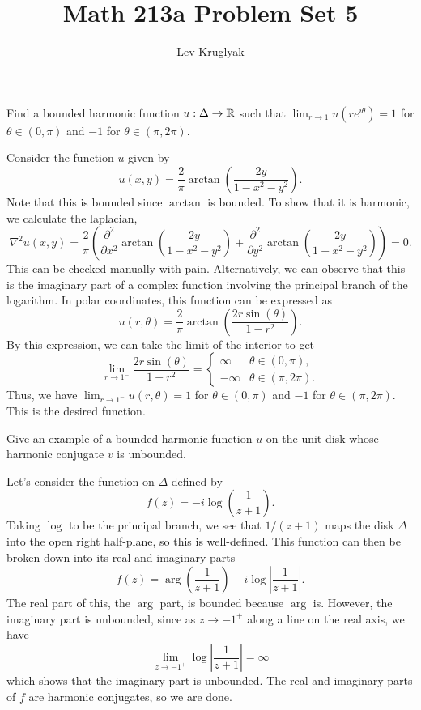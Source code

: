 \documentclass{pset}
\title{Math 213a Problem Set 5}
\author{Lev Kruglyak}
\begin{document}
\maketitle
\collaborators

\begin{problem}{1.39}
  Find a bounded harmonic function $u : \Delta \to \mathbb{R}$ such that $\lim_{r\to 1} u(re^{i\theta})=1$ for $\theta\in (0,\pi)$ and $-1$ for $\theta\in (\pi, 2\pi)$.
\end{problem}

\begin{solution}
  Consider the function $u$ given by
  \[
    u(x,y) = \frac{2}{\pi}\arctan\left(\frac{2y}{1-x^2-y^2}\right).
  \]
  Note that this is bounded since $\arctan$ is bounded. To show that it is harmonic, we calculate the laplacian,
  \[
    \nabla^2 u(x,y) = \frac{2}{\pi}\left(\frac{\partial^2}{\partial x^2}\arctan\left(\frac{2y}{1-x^2-y^2}\right) + \frac{\partial^2}{\partial y^2}\arctan\left(\frac{2y}{1-x^2-y^2}\right)\right)=0.
  \]
  This can be checked manually with pain. Alternatively, we can observe that this is the imaginary part of a complex function involving the principal branch of the logarithm. 
  In polar coordinates, this function can be expressed as 
  \[
    u(r,\theta)=\frac{2}{\pi}\arctan\left(\frac{2r\sin(\theta)}{1-r^2}\right).
  \]
  By this expression, we can take the limit of the interior to get
  \[\lim_{r\to 1^-} \frac{2r\sin(\theta)}{1-r^2} = \begin{cases}\infty & \theta\in (0,\pi),\\ -\infty & \theta \in (\pi, 2\pi).\end{cases}\]
  Thus, we have $\lim_{r\to 1^-} u(r, \theta) = 1$ for $\theta\in (0,\pi)$ and $-1$ for $\theta\in(\pi, 2\pi)$. This is the desired function.
\end{solution}

\begin{problem}{1.40}
  Give an example of a bounded harmonic function $u$ on the unit disk whose harmonic conjugate $v$ is unbounded.
\end{problem}

\begin{solution}
  Let's consider the function on $\Delta$ defined by
  \[
    f(z) = -i\log\left(\frac{1}{z+1}\right).
  \]
  Taking $\log$ to be the principal branch, we see that $1/(z+1)$ maps the disk $\Delta$ into the open right half-plane, so this is well-defined. This function can then be broken down into its real and imaginary parts
  \[
    f(z) =\arg\left(\frac{1}{z+1}\right)-i\log\left|\frac{1}{z+1}\right|.
  \]
  The real part of this, the $\arg$ part, is bounded because $\arg$ is. However, the imaginary part is unbounded, since as $z \to -1^+$ along a line on the real axis, we have
  \[
    \lim_{z\to -1^+} \log\left|\frac{1}{z+1}\right| = \infty
  \]
  which shows that the imaginary part is unbounded. The real and imaginary parts of $f$ are harmonic conjugates, so we are done.
\end{solution}
\end{document}
